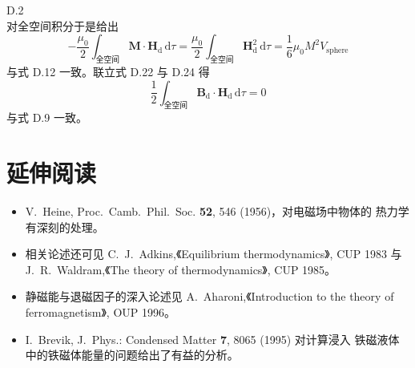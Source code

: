 \begin{example}{D.2}
\begin{equation*}
\end{equation*}
对全空间积分于是给出
\begin{equation*}
-\frac{\mu_0}{2}\int_{\text{全空间}}\mathbf{M}\cdot\mathbf{H}_{\mathrm{d}}\,\mathrm{d}\tau = \frac{\mu_0}{2}\int_{\text{全空间}}\mathbf{H}_{\mathrm{d}}^{2}\,\mathrm{d}\tau = \frac{1}{6}\mu_0M^{2}V_{\text{sphere}}\tag{D.25}
\end{equation*}
与式 D.12 一致。联立式 D.22 与 D.24 得
\begin{equation*}
\frac{1}{2}\int_{\text{全空间}}\mathbf{B}_{\mathrm{d}}\cdot\mathbf{H}_{\mathrm{d}}\,\mathrm{d}\tau = 0\tag{D.26}
\end{equation*}
与式 D.9 一致。
\end{example}

\section*{延伸阅读}

\begin{itemize}[itemsep=0.2em]
\item V.~Heine, Proc.~Camb.~Phil.~Soc. \textbf{52}, 546 (1956)，对电磁场中物体的
热力学有深刻的处理。
\item 相关论述还可见 C.~J.~Adkins,《Equilibrium thermodynamics》, CUP 1983 与
J.~R.~Waldram,《The theory of thermodynamics》, CUP 1985。
\item 静磁能与退磁因子的深入论述见 A.~Aharoni,《Introduction to the theory of
ferromagnetism》, OUP 1996。
\item I.~Brevik, J.~Phys.: Condensed Matter \textbf{7}, 8065 (1995) 对计算浸入
铁磁液体中的铁磁体能量的问题给出了有益的分析。
\end{itemize}
